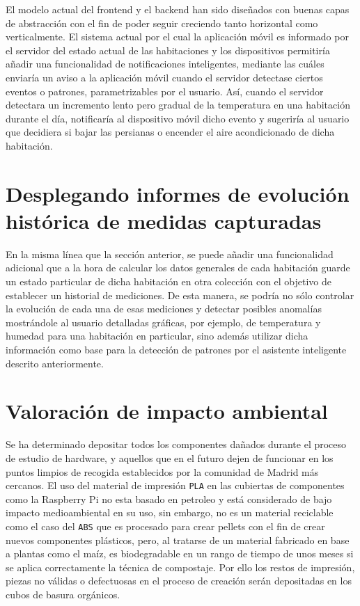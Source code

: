 El modelo actual del frontend y el backend han sido diseñados con buenas capas de abstracción con el fin de poder seguir creciendo tanto horizontal como verticalmente. El sistema actual por el cual la aplicación móvil es informado por el servidor del estado actual de las habitaciones y los dispositivos permitiría añadir una funcionalidad de notificaciones inteligentes, mediante las cuáles enviaría un aviso a la aplicación móvil cuando el servidor detectase ciertos eventos o patrones, parametrizables por el usuario. Así, cuando el servidor detectara un incremento lento pero gradual de la temperatura en una habitación durante el día, notificaría al dispositivo móvil dicho evento y sugeriría al usuario que decidiera si bajar las persianas o encender el aire acondicionado de dicha habitación.

\section{Desplegando informes de evolución histórica de medidas capturadas}
\label{ch:Capitulo6.6}

En la misma línea que la sección anterior, se puede añadir una funcionalidad adicional que a la hora de calcular los datos generales de cada habitación guarde un estado particular de dicha habitación en otra colección con el objetivo de establecer un historial de mediciones. De esta manera, se podría no sólo controlar la evolución de cada una de esas mediciones y detectar posibles anomalías mostrándole al usuario detalladas gráficas, por ejemplo, de temperatura y humedad para una habitación en particular, sino además utilizar dicha información como base para la detección de patrones por el asistente inteligente descrito anteriormente.

\section{Valoración de impacto ambiental}
\label{ch:Capitulo6.7}

Se ha determinado depositar todos los componentes dañados durante el proceso de estudio de hardware, y aquellos que en el futuro dejen de funcionar en los puntos limpios de recogida establecidos por la comunidad de Madrid más cercanos. El uso del material de impresión \verb|PLA| en las cubiertas de componentes como la Raspberry Pi no esta basado en petroleo y está considerado de bajo impacto medioambiental en su uso, sin embargo, no es un material reciclable como el caso del \verb|ABS| que es procesado para crear pellets con el fin de crear nuevos componentes plásticos, pero, al tratarse de un material fabricado en base a plantas como el maíz, es biodegradable en un rango de tiempo de unos meses si se aplica correctamente la técnica de compostaje. Por ello los restos de impresión, piezas no válidas o defectuosas en el proceso de creación serán depositadas en los cubos de basura orgánicos.